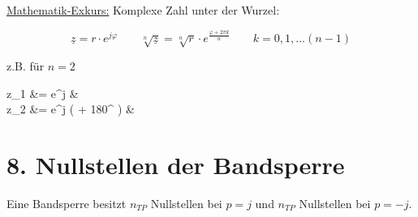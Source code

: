 \documentclass[a4paper, 12pt]{report}
\begin{document}
	\underline{Mathematik-Exkurs:} Komplexe Zahl unter der Wurzel:
	
	\[ \underline{z} = r \cdot e^{j\varphi} \qquad \sqrt[n]{\underline{z}} = \sqrt[n]{r} \cdot e^{\frac{\varphi + 2\pi k}{n}} \qquad k = 0, 1, ... (n-1) \]
	
	\begin{minipage}[t]{0.4\textwidth}
		\vspace{0.17cm}
		\begin{flushright}
			z.B. für $ n = 2 $
		\end{flushright}
	\end{minipage}
	\begin{minipage}[t]{0.6\textwidth}
		\vspace{-0.5cm}
		\begin{flalign*}
			\qquad z_1 &=  \cdot e^{j\varphi} &\\
			z_2 &=  \cdot e^{j \cdot ( \varphi + 180^{\circ} ) } &
		\end{flalign*}
	\end{minipage}
	
\section*{8. Nullstellen der Bandsperre}
	Eine Bandsperre besitzt $ n_{TP} $ Nullstellen bei $ p = j $ und $ n_{TP} $ Nullstellen bei $ p = -j $.
\end{document}
